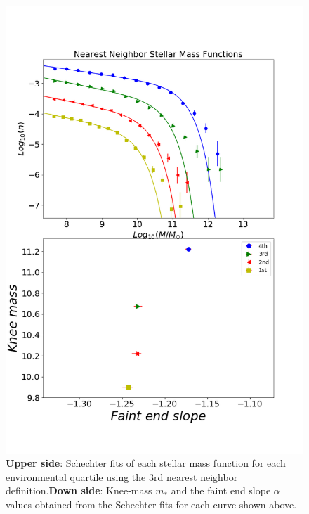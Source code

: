 \documentclass[a4paper,fleqn,usenatbib]{mnras}
\begin{document}
\begin{figure}
	\includegraphics[width=\columnwidth]{./pics/quartilesSellar.png}
    \caption{\textbf{Upper side}: Schechter fits of each stellar mass
      function for each environmental quartile using the 3rd nearest
      neighbor definition.\textbf{Down side}: Knee-mass $m_\ast$ and
      the faint end slope $\alpha$ values obtained from the Schechter
      fits for each curve shown above.} 
    \label{fig:quartilesStellar}
\end{figure}
\end{document}
